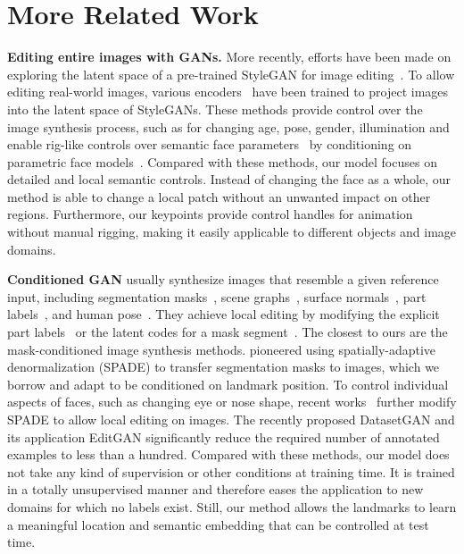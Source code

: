 \documentclass[10pt, conference, compsocconf]{IEEEtran}
\begin{document}
\section{More Related Work} \label{sec:related_work}
\textbf{Editing entire images with GANs.}
More recently, efforts have been made on exploring the latent space of a pre-trained StyleGAN for image editing~\cite{shen2020interpreting, Jahanian*2020On}. To allow editing real-world images, various encoders~\cite{zhu2020domain, abdal2019image2stylegan, abdal2020image2stylegan++, guan2020collaborative, wulff2020improving, richardson2020encoding} have been trained to project images into the latent space of StyleGANs. These methods provide control over the image synthesis process, such as for changing age, pose, gender, illumination and enable rig-like controls over semantic face parameters~\cite{tewari2020stylerig, tewari2020pie, ghosh2020gif, deng2020disentangled} by conditioning on parametric face models~\cite{blanz1999morphable, FLAME:SiggraphAsia2017}. 
Compared with these methods, our model focuses on detailed and local semantic controls. Instead of changing the face as a whole, our method is able to change a local patch without an unwanted impact on other regions. Furthermore, our keypoints provide control handles for animation without manual rigging, making it easily applicable to different objects and image domains. 

\textbf{Conditioned GAN} usually synthesize images that resemble a given reference input, including segmentation masks~\cite{sola2017image,zhu2017unpaired,park2019semantic}, scene graphs~\cite{johnson2018image, li2021controllable}, surface normals~\cite{wang2016generative}, part labels~\cite{cheng2020segvae}, and human pose~\cite{men2020controllable}. They achieve local editing by modifying the explicit part labels~\cite{johnson2018image, li2021controllable, cheng2020segvae} or the latent codes for a mask segment~\cite{park2019semantic, men2020controllable}. The closest to ours are the mask-conditioned image synthesis methods.
\cite{park2019semantic} pioneered using spatially-adaptive denormalization (SPADE) to transfer segmentation masks to images, which we borrow and adapt to be conditioned on landmark position. To control individual aspects of faces, such as changing eye or nose shape, recent works~\cite{zhu2020sean, tan2021efficient, tan2021diverse}
further modify SPADE to allow local editing on images. 
The recently proposed DatasetGAN \cite{zhang2021datasetgan} and its application EditGAN \cite{ling2021editgan} significantly reduce the required number of annotated examples to less than a hundred.
Compared with these methods, our model does not take any kind of supervision or other conditions at training time. It is trained in a totally unsupervised manner and therefore eases the application to new domains for which no labels exist. Still, our method allows the landmarks to learn a meaningful location and semantic embedding that can be controlled at test time. 
\end{document}
